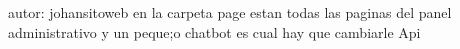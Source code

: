 autor: johansitoweb
en la carpeta page estan todas las paginas del panel administrativo
y un peque;o chatbot es cual hay que cambiarle Api 